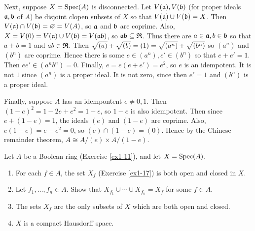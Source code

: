 \documentclass{article}
\begin{document}
Next, suppose \(X = \operatorname{Spec}(A)\) is disconnected.
Let \(V(\mathfrak{a}), V(\mathfrak{b})\) (for proper ideals \(\mathfrak{a}, \mathfrak{b}\) of \(A\)) be disjoint clopen subsets of \(X\) so that \(V(\mathfrak{a}) \cup V(\mathfrak{b}) = X\).
Then \(V(\mathfrak{a}) \cap V(\mathfrak{b}) = \varnothing = V(A)\), so \(\mathfrak{a}\) and \(\mathfrak{b}\) are coprime.
Also, \(X = V(0) = V(\mathfrak{a}) \cup V(\mathfrak{b}) = V(\mathfrak{a} \mathfrak{b})\), so \(\mathfrak{a} \mathfrak{b} \subseteq \mathfrak{R}\).
Thus there are \(a \in \mathfrak{a}, b \in \mathfrak{b}\) so that \(a + b = 1\) and \(ab \in \mathfrak{R}\).
Then \(\sqrt{(a)} + \sqrt{(b)} = (1) = \sqrt{(a^n)} + \sqrt{(b^n)}\) so \((a^n)\) and \((b^n)\) are coprime.
Hence there is some \(e \in (a^n), e' \in (b^n)\) so that \(e + e' = 1\).
Then \(e e' \in (a^n b^n) = 0\).
Finally, \(e = e (e + e') = e^2\), so \(e\) is an idempotent.
It is not \(1\) since \((a^n)\) is a proper ideal.
It is not zero, since then \(e' = 1\) and \((b^n)\) is a proper ideal.

Finally, suppose \(A\) has an idempontent \(e \neq 0, 1\).
Then \((1 - e)^2 = 1 - 2e + e^2 = 1 - e\), so \(1-e\) is also idempotent.
Then since \(e + (1 - e) = 1\), the ideals \((e)\) and \((1 - e)\) are coprime.
Also, \(e (1-e) = e - e^2 = 0\), so \((e) \cap (1 - e) = (0)\).
Hence by the Chinese remainder theorem, \(A \cong A/(e) \times A/(1-e)\).

\begin{exercise} \label{ex1-23}
    Let \(A\) be a Boolean ring (Exercise \ref{ex1-11}), and let \(X = \operatorname{Spec}(A)\).
    \begin{enumerate}
        \item
            For each \(f \in A\), the set \(X_f\) (Exercise \ref{ex1-17}) is both open and closed in \(X\).
        \item
            Let \(f_1, \dots, f_n \in A\).
            Show that \(X_{f_1} \cup \cdots \cup X_{f_n} = X_f\) for some \(f \in A\).
        \item
            The sets \(X_f\) are the only subsets of \(X\) which are both open and closed.
        \item
            \(X\) is a compact Hausdorff space.
    \end{enumerate}
\end{exercise}
\end{document}
